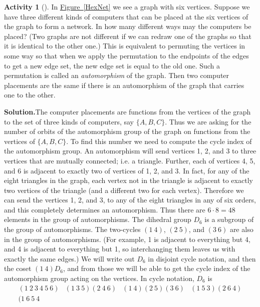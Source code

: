 \documentclass[10pt,]{book}
\theoremstyle{plain}
\theoremstyle{definition}
\newtheorem{activity}[project]{Activity}
\numberwithin{equation}{chapter}
\newcommand{\amp}{&}
\begin{document}
\begin{activity}[]\label{activity-332}
In \hyperref[HexNet]{Figure~\ref{HexNet}} we see a graph with six vertices. Suppose we have three different kinds of computers that can be placed at the six vertices of the graph to form a network. In how many different ways may the computers be placed? (Two graphs are not different if we can redraw one of the graphs so that it is identical to the other one.) This is equivalent to permuting the vertices in some way so that when we apply the permutation to the endpoints of the edges to get a new edge set, the new edge set is equal to the old one. Such a permutation is called an \emph{automorphism} of the graph. Then two computer placements are the same if there is an automorphism of the graph that carries one to the other.%
\par\medskip\noindent%
\textbf{Solution.}\quad The computer placements are functions from the vertices of the graph to the set of three kinds of computers, say \(\{A,B,C\}\). Thus we are asking for the number of orbits of the automorphism group of the graph on functions from the vertices of \(\{A, B,
C\}\). To find this number we need to compute the cycle index of the automorphism group. An automorphism will send vertices 1, 2, and 3 to three vertices that are mutually connected; i.e. a triangle. Further, each of vertices 4, 5, and 6 is adjacent to exactly two of vertices of 1, 2, and 3. In fact, for any of the eight triangles in the graph, each vertex not in the triangle is adjacent to exactly two vertices of the triangle (and a different two for each vertex). Therefore we can send the vertices 1, 2, and 3, to any of the eight triangles in any of six orders, and this completely determines an automorphism. Thus there are \(6\cdot8=48\) elements in the group of automorphisms. The dihedral group \(D_6\) is a subgroup of the group of automorphisms. The two-cycles \((1\ 4)\), \((2\ 5)\), and \((3\ 6)\) are also in the group of automorphisms. (For example, 1 is adjacent to everything but 4, and 4 is adjacent to everything but 1, so interchanging them leaves us with exactly the same edges.) We will write out \(D_6\) in disjoint cycle notation, and then the coset \((1\ 4)D_6\), and from those we will be able to get the cycle index of the automorphism group acting on the vertices. In cycle notation, \(D_6\) is%
\begin{equation*}
\begin{array}{cccc}
(1\ 2\ 3\ 4\ 5\ 6)\amp (1\ 3\ 5)(2\ 4\ 6)\amp (1\ 4)(2\ 5)(3 \ 6)\amp  (1\ 5\ 3)(2\ 6\ 4)\\(1\ 6\ 5\ 4\

\end{array}
\end{equation*}
\end{activity}
\end{document}
